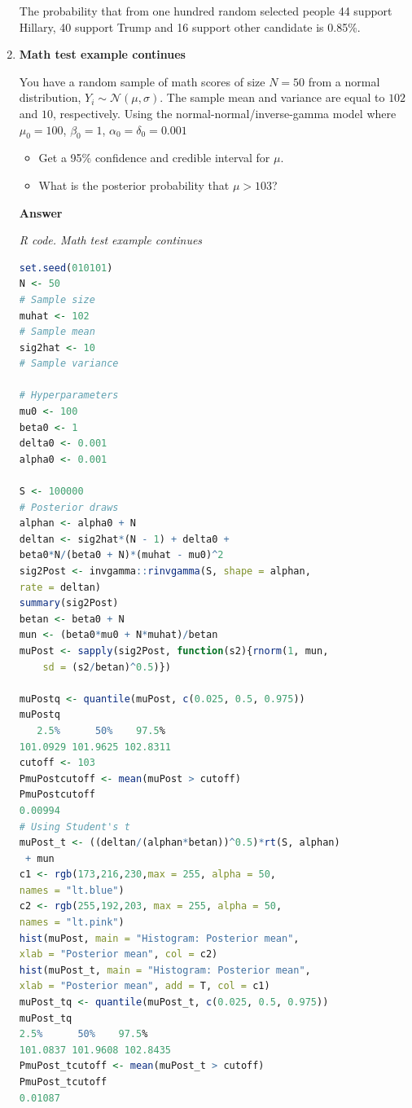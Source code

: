 \begin{enumerate}[leftmargin=*]
The probability that from one hundred random selected people 44 support Hillary, 40 support Trump and 16 support other candidate is 0.85\%.

\item \textbf{Math test example continues}

You have a random sample of math scores of size $N=50$ from a normal distribution, $Y_i\sim \mathcal{N}(\mu, \sigma)$. The sample mean and variance are equal to $102$ and $10$, respectively. Using the normal-normal/inverse-gamma model where $\mu_0=100$, $\beta_0=1$, $\alpha_0=\delta_0=0.001$

\begin{itemize}
	\item Get a 95\% confidence and credible interval for $\mu$.
	\item What is the posterior probability that $\mu > 103$?  
\end{itemize}  

{\textbf{Answer}}

\begin{tcolorbox}[enhanced,width=4.67in,center upper,
	fontupper=\large\bfseries,drop shadow southwest,sharp corners]
	\textit{R code. Math test example continues}
\begin{VF}
\begin{lstlisting}[basicstyle=\footnotesize, language=R]
set.seed(010101)
N <- 50
# Sample size
muhat <- 102
# Sample mean
sig2hat <- 10
# Sample variance

# Hyperparameters
mu0 <- 100
beta0 <- 1
delta0 <- 0.001
alpha0 <- 0.001

S <- 100000
# Posterior draws
alphan <- alpha0 + N
deltan <- sig2hat*(N - 1) + delta0 + 
beta0*N/(beta0 + N)*(muhat - mu0)^2
sig2Post <- invgamma::rinvgamma(S, shape = alphan, 
rate = deltan)
summary(sig2Post)
betan <- beta0 + N
mun <- (beta0*mu0 + N*muhat)/betan
muPost <- sapply(sig2Post, function(s2){rnorm(1, mun, 
	sd = (s2/betan)^0.5)})

muPostq <- quantile(muPost, c(0.025, 0.5, 0.975))
muPostq
   2.5%      50%    97.5% 
101.0929 101.9625 102.8311
cutoff <- 103
PmuPostcutoff <- mean(muPost > cutoff)
PmuPostcutoff
0.00994
# Using Student's t
muPost_t <- ((deltan/(alphan*betan))^0.5)*rt(S, alphan)
 + mun
c1 <- rgb(173,216,230,max = 255, alpha = 50, 
names = "lt.blue")
c2 <- rgb(255,192,203, max = 255, alpha = 50, 
names = "lt.pink")
hist(muPost, main = "Histogram: Posterior mean", 
xlab = "Posterior mean", col = c2)
hist(muPost_t, main = "Histogram: Posterior mean", 
xlab = "Posterior mean", add = T, col = c1)
muPost_tq <- quantile(muPost_t, c(0.025, 0.5, 0.975))
muPost_tq
2.5%      50%    97.5% 
101.0837 101.9608 102.8435
PmuPost_tcutoff <- mean(muPost_t > cutoff)
PmuPost_tcutoff
0.01087
\end{lstlisting}
\end{VF}
\end{tcolorbox} 


\end{enumerate}
